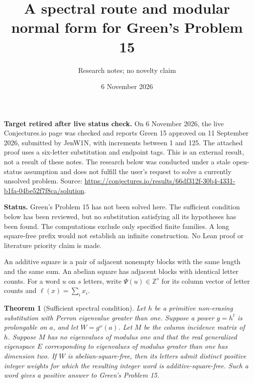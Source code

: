 \documentclass[11pt]{article}
\title{A spectral route and modular normal form for Green's Problem 15}
\author{Research notes; no novelty claim}
\date{6 November 2026}
\newtheorem{theorem}{Theorem}
\begin{document}
\maketitle

\noindent\textbf{Target retired after live status check.} On 6 November 2026,
the live Conjectures.io page was checked and reports Green 15 approved on
11 September 2026, submitted by JenW1N, with increments between 1 and 125.
The attached proof uses a six-letter substitution and endpoint tags.
This is an external result, not a result of these notes. The research below
was conducted under a stale open-status assumption and does not fulfill
the user's request to solve a currently unsolved problem. Source:
\url{https://conjectures.io/results/66df312f-30b4-4331-b1fa-04be52f7f8ca/solution}.

\noindent\textbf{Status.} Green's Problem 15 has not been solved here.
The sufficient condition below has been reviewed, but no substitution satisfying
all its hypotheses has been found. The computations exclude only specified finite
families. A long square-free prefix would not establish an infinite construction.
No Lean proof or literature priority claim is made.

An additive square is a pair of adjacent nonempty blocks with the same length
and the same sum. An abelian square has adjacent blocks with identical letter
counts. For a word $u$ on $s$ letters, write $\Psi(u)\in\mathbb Z^s$ for its
column vector of letter counts and $\ell(x)=\sum_i x_i$.

\begin{theorem}[Sufficient spectral condition]
Let $h$ be a primitive non-erasing substitution with Perron eigenvalue greater
than one. Suppose a power $g=h^t$ is prolongable on $a$, and let
$W=g^\omega(a)$. Let $M$ be the column incidence matrix of $h$.
Suppose $M$ has no eigenvalues of modulus one and that the real generalized
eigenspace $E$ corresponding to eigenvalues of modulus greater than one has
dimension two. If $W$ is abelian-square-free, then its letters admit distinct
positive integer weights for which the resulting integer word is additive-square-free.
Such a word gives a positive answer to Green's Problem 15.
\end{theorem}
\end{document}
